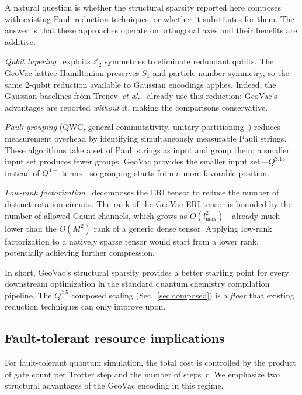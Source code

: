 \documentclass[aps,pra,twocolumn,superscriptaddress,longbibliography]{revtex4-2}
\begin{document}
A natural question is whether the structural sparsity reported here
composes with existing Pauli reduction techniques, or whether it
substitutes for them.  The answer is that these approaches operate on
orthogonal axes and their benefits are additive.

\emph{Qubit tapering}~\cite{bravyi2017} exploits $\mathbb{Z}_2$
symmetries to eliminate redundant qubits.  The GeoVac lattice
Hamiltonian preserves $S_z$ and particle-number symmetry, so the
same 2-qubit reduction available to Gaussian encodings applies.
Indeed, the Gaussian baselines from Trenev~\textit{et
al.}~\cite{trenev2025} already use this reduction; GeoVac's
advantages are reported \emph{without} it, making the comparisons
conservative.

\emph{Pauli grouping} (QWC, general commutativity, unitary
partitioning~\cite{verteletskyi2020,yen2020}) reduces measurement
overhead by identifying simultaneously measurable Pauli strings.
These algorithms take a set of Pauli strings as input and group them;
a smaller input set produces fewer groups.  GeoVac provides the
smaller input set---$Q^{3.15}$ instead of $Q^{4+}$ terms---so
grouping starts from a more favorable position.

\emph{Low-rank factorization}~\cite{motta2021,lee2021} decomposes the
ERI tensor to reduce the number of distinct rotation circuits.  The
rank of the GeoVac ERI tensor is bounded by the number of allowed
Gaunt channels, which grows as $O(l_{\max}^2)$---already much lower
than the $O(M^2)$ rank of a generic dense tensor.  Applying low-rank
factorization to a natively sparse tensor would start from a lower
rank, potentially achieving further compression.

In short, GeoVac's structural sparsity provides a better starting
point for every downstream optimization in the standard quantum
chemistry compilation pipeline.  The $Q^{2.5}$ composed scaling
(Sec.~\ref{sec:composed}) is a \emph{floor} that existing reduction
techniques can only improve upon.

\subsection{Fault-tolerant resource implications}
\label{sec:ft_resources}

For fault-tolerant quantum simulation, the total cost is controlled
by the product of gate count per Trotter step and the number of
steps~$r$.  We emphasize two structural advantages of the GeoVac
encoding in this regime.
\end{document}
